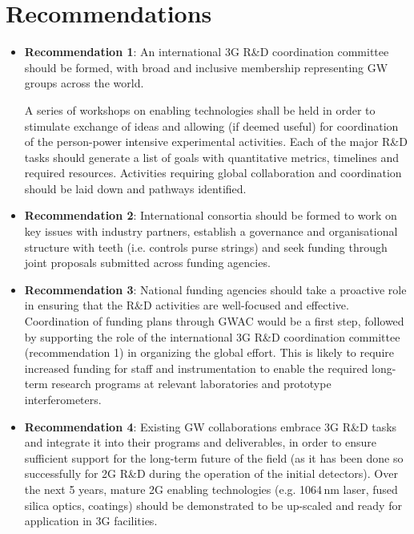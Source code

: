 \section*{Recommendations}
\begin{itemize}
\item \textbf{Recommendation 1}:  An international 3G R\&D coordination committee should be formed, with broad and inclusive membership representing GW groups across the world.

 A series of workshops on enabling technologies shall be held in order to stimulate exchange of ideas and allowing (if deemed useful) for coordination of the person-power intensive experimental activities.  Each of the major R\&D tasks should generate a list of  goals with quantitative metrics,  timelines and required resources.   Activities requiring global collaboration and coordination should be laid down and pathways identified.

\item \textbf{Recommendation 2}:  International consortia should be formed to work on key issues with industry partners, establish a governance and organisational structure with teeth (i.e. controls purse strings) and seek funding through joint proposals submitted across funding agencies.
\pagebreak
\item \textbf{Recommendation 3}: 
National funding agencies should take a proactive role in ensuring that the R\&D activities are well-focused and effective.  Coordination of funding plans through GWAC would be a first step, followed by supporting the role of the international 3G R\&D coordination committee (recommendation 1) in organizing the global effort.  This is likely to require increased funding for staff and instrumentation to enable the required long-term research programs at relevant laboratories and prototype interferometers.

\item \textbf{Recommendation 4}: Existing GW collaborations embrace 3G R\&D tasks and integrate it into their programs and deliverables, in order to ensure sufficient support for the long-term future of the field (as it has been done so successfully for 2G R\&D during the operation of the initial detectors). Over the next 5 years, mature 2G enabling technologies (e.g. 1064\,nm laser, fused silica optics, coatings) should be demonstrated to be up-scaled and ready for application in 3G facilities.



\end{itemize}

